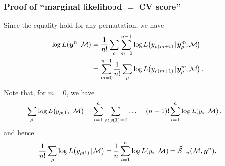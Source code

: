 \documentclass[18pt]{beamer}
\newcommand{\defineTightSpacing}{%
	\setlength{\abovedisplayskip}{.25\baselineskip}%
	\setlength{\belowdisplayskip}{.25\baselineskip}%
}
\newcommand{\given}{\thinnerspace | \thinnerspace}
\newcommand{\spacedEq}{\mkern 1mu = \mkern 1.5mu}
\newcommand{\thinnerspace}{\mskip.5\thinmuskip}
\newcommand{\negthinnerspace}{\mskip-.5\thinmuskip}
\newcommand{\likelihood}{L}
\newcommand{\by}{\bm{y}}
\newcommand{\score}{\mathcal{S}}
\newcommand{\modelSymbol}{\mathcal{M}}
\newcommand{\permutation}{\rho}
\newcommand{\trainingSize}{m}
\newcommand{\testSampleIndex}{i}
\begin{document}
\begin{frame}
\frametitle{Proof of ``marginal likelihood $=$ {\large CV} score''}
Since the equality hold for any permutation, we have
\begin{equation*} \defineTightSpacing%
\begin{aligned}
\log \likelihood(\by^n \given \modelSymbol)
	&= \frac{1}{n!} \sum_\permutation \sum_{m = 0}^{n - 1} \log \likelihood\!\left(y_{\permutation(\trainingSize + 1)} \given \by_\permutation^\trainingSize\negthinnerspace, \modelSymbol \right) \\
	&= \sum_{m = 0}^{n - 1} \frac{1}{n!} \sum_\permutation  \log \likelihood\!\left(y_{\permutation(\trainingSize + 1)} \given \by_\permutation^\trainingSize\negthinnerspace, \modelSymbol \right).
\end{aligned}
\end{equation*}

Note that, for $m = 0$, we have 
\begin{equation*} \defineTightSpacing%
\begin{aligned}
\sum_\permutation \log \likelihood\!\left(y_{\permutation(1)} \given \modelSymbol \right)
	= \sum_{\testSampleIndex = 1}^n \sum_{\permutation \thinnerspace : \, \permutation(1) \spacedEq i} \ldots \thinnerspace
	&= (n - 1)! \sum_{\testSampleIndex = 1}^n \log \likelihood\!\left(y_\testSampleIndex \given \modelSymbol \right),
\end{aligned}
\end{equation*}
and hence
\begin{equation*} \defineTightSpacing%
\frac{1}{n!} \sum_\permutation \log \likelihood\!\left(y_{\permutation(1)} \given \modelSymbol \right)
	= \frac{1}{n} \sum_{\testSampleIndex = 1}^n \log \likelihood\!\left(y_\testSampleIndex \given \modelSymbol \right)
	= \widehat{\score}_{-n}(\modelSymbol, \by^n).
\end{equation*}
\end{frame}
\end{document}
